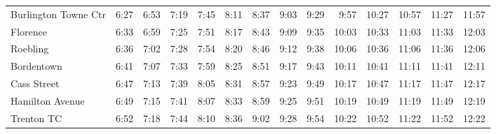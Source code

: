 \begin{center}
\begin{tabular}{@{}lrrrrrrrrrrrrr@{}}
Burlington Towne Ctr & 6:27 & 6:53 & 7:19 & 7:45 & 8:11 & 8:37 & 9:03 & 9:29 & 9:57 & 10:27 & 10:57 & 11:27 & 11:57 \\
Florence & 6:33 & 6:59 & 7:25 & 7:51 & 8:17 & 8:43 & 9:09 & 9:35 & 10:03 & 10:33 & 11:03 & 11:33 & 12:03 \\
Roebling & 6:36 & 7:02 & 7:28 & 7:54 & 8:20 & 8:46 & 9:12 & 9:38 & 10:06 & 10:36 & 11:06 & 11:36 & 12:06 \\
Bordentown & 6:41 & 7:07 & 7:33 & 7:59 & 8:25 & 8:51 & 9:17 & 9:43 & 10:11 & 10:41 & 11:11 & 11:41 & 12:11 \\
Cass Street & 6:47 & 7:13 & 7:39 & 8:05 & 8:31 & 8:57 & 9:23 & 9:49 & 10:17 & 10:47 & 11:17 & 11:47 & 12:17 \\
Hamilton Avenue & 6:49 & 7:15 & 7:41 & 8:07 & 8:33 & 8:59 & 9:25 & 9:51 & 10:19 & 10:49 & 11:19 & 11:49 & 12:19 \\
Trenton TC & 6:52 & 7:18 & 7:44 & 8:10 & 8:36 & 9:02 & 9:28 & 9:54 & 10:22 & 10:52 & 11:22 & 11:52 & 12:22 \\
\bottomrule\end{tabular}\end{center}
